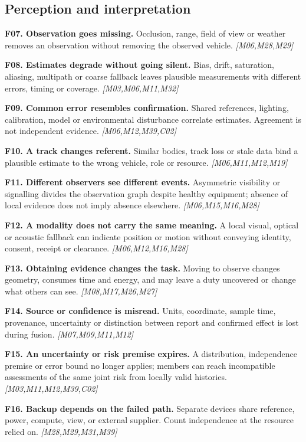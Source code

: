 \documentclass[11pt]{article}
\newcommand{\f}[4]{\par\smallskip\noindent\textbf{#1. #2.} #3 \textit{[#4]}\par}
\begin{document}
\subsection{Perception and interpretation}
\f{F07}{Observation goes missing}{Occlusion, range, field of view or weather removes an observation without removing the observed vehicle.}{M06,M28,M29}
\f{F08}{Estimates degrade without going silent}{Bias, drift, saturation, aliasing, multipath or coarse fallback leaves plausible measurements with different errors, timing or coverage.}{M03,M06,M11,M32}
\f{F09}{Common error resembles confirmation}{Shared references, lighting, calibration, model or environmental disturbance correlate estimates. Agreement is not independent evidence.}{M06,M12,M39,C02}
\f{F10}{A track changes referent}{Similar bodies, track loss or stale data bind a plausible estimate to the wrong vehicle, role or resource.}{M06,M11,M12,M19}
\f{F11}{Different observers see different events}{Asymmetric visibility or signalling divides the observation graph despite healthy equipment; absence of local evidence does not imply absence elsewhere.}{M06,M15,M16,M28}
\f{F12}{A modality does not carry the same meaning}{A local visual, optical or acoustic fallback can indicate position or motion without conveying identity, consent, receipt or clearance.}{M06,M12,M16,M28}
\f{F13}{Obtaining evidence changes the task}{Moving to observe changes geometry, consumes time and energy, and may leave a duty uncovered or change what others can see.}{M08,M17,M26,M27}
\f{F14}{Source or confidence is misread}{Units, coordinate, sample time, provenance, uncertainty or distinction between report and confirmed effect is lost during fusion.}{M07,M09,M11,M12}
\f{F15}{An uncertainty or risk premise expires}{A distribution, independence premise or error bound no longer applies; members can reach incompatible assessments of the same joint risk from locally valid histories.}{M03,M11,M12,M39,C02}
\f{F16}{Backup depends on the failed path}{Separate devices share reference, power, compute, view, or external supplier. Count independence at the resource relied on.}{M28,M29,M31,M39}
\end{document}
